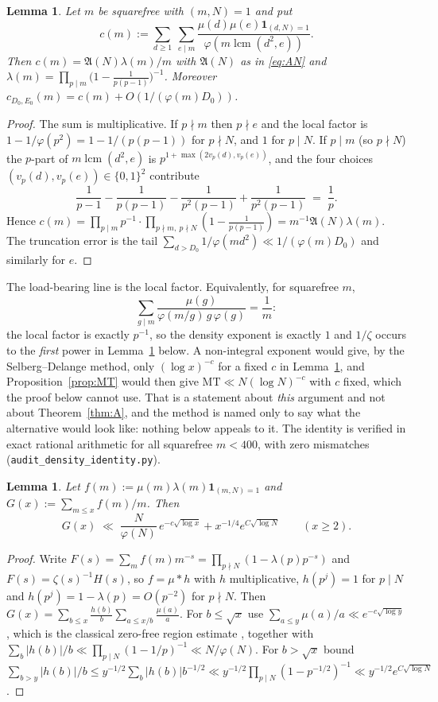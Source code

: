 \documentclass[11pt,a4paper]{article}
\theoremstyle{plain}
\newtheorem{lemma}[theorem]{Lemma}
\theoremstyle{definition}
\theoremstyle{remark}
\newcommand{\AAA}{\mathfrak{A}}
\DeclareMathOperator{\lcm}{lcm}
\begin{document}
\begin{lemma}\label{lem:density}
Let $m$ be squarefree with $(m,N)=1$ and put
\[
  c(m):=\sum_{d\ge1}\ \sum_{e\mid m}
     \frac{\mu(d)\mu(e)\mathbf 1_{(d,N)=1}}{\varphi(m\lcm(d^2,e))}.
\]
Then $c(m)=\AAA(N)\lambda(m)/m$ with $\AAA(N)$ as in \eqref{eq:AN} and
$\lambda(m)=\prod_{p\mid m}\bigl(1-\tfrac{1}{p(p-1)}\bigr)^{-1}$.
Moreover $c_{D_0,E_0}(m)=c(m)+O(1/(\varphi(m)D_0))$.
\end{lemma}

\begin{proof}
The sum is multiplicative. If $p\nmid m$ then $p\nmid e$ and the local
factor is $1-1/\varphi(p^2)=1-1/(p(p-1))$ for $p\nmid N$, and $1$ for
$p\mid N$. If $p\mid m$ (so $p\nmid N$) the $p$-part of
$m\lcm(d^2,e)$ is $p^{1+\max(2v_p(d),v_p(e))}$, and the four choices
$(v_p(d),v_p(e))\in\{0,1\}^2$ contribute
\[
  \frac{1}{p-1}-\frac{1}{p(p-1)}-\frac{1}{p^2(p-1)}+\frac{1}{p^2(p-1)}
  \;=\;\frac{1}{p}.
\]
Hence $c(m)=\prod_{p\mid m}p^{-1}\cdot
\prod_{p\nmid m,\ p\nmid N}(1-\tfrac{1}{p(p-1)})
=m^{-1}\AAA(N)\lambda(m)$. The truncation error is the tail
$\sum_{d>D_0}1/\varphi(md^2)\ll1/(\varphi(m)D_0)$ and similarly for
$e$.
\end{proof}

The load-bearing line is the local factor. Equivalently, for squarefree
$m$,
\[
  \sum_{g\mid m}\frac{\mu(g)}{\varphi(m/g)\,g\,\varphi(g)}=\frac1m :
\]
the local factor is exactly $p^{-1}$, so the density exponent is
exactly $1$ and $1/\zeta$ occurs to the \emph{first} power in
Lemma~\ref{lem:mu} below. A non-integral exponent would give, by
the Selberg--Delange method, only $(\log x)^{-c}$ for a fixed $c$ in
Lemma~\ref{lem:mu}, and Proposition~\ref{prop:MT} would then give
$\mathrm{MT}\ll N(\log N)^{-c}$ with $c$ fixed, which the proof below
cannot use. That is a statement about \emph{this} argument and not
about Theorem~\ref{thm:A}, and the method is named only to say what
the alternative would look like: nothing below appeals to it. The
identity is verified in exact rational arithmetic for all squarefree
$m<400$, with zero mismatches
(\texttt{audit\_density\_identity.py}).

\begin{lemma}\label{lem:mu}
Let $f(m):=\mu(m)\lambda(m)\mathbf 1_{(m,N)=1}$ and
$G(x):=\sum_{m\le x}f(m)/m$. Then
\[
  G(x)\;\ll\;\frac{N}{\varphi(N)}\,e^{-c\sqrt{\log x}}
   +x^{-1/4}e^{C\sqrt{\log N}}
   \qquad(x\ge2).
\]
\end{lemma}

\begin{proof}
Write $F(s)=\sum_m f(m)m^{-s}=\prod_{p\nmid N}(1-\lambda(p)p^{-s})$
and $F(s)=\zeta(s)^{-1}H(s)$, so $f=\mu*h$ with $h$ multiplicative,
$h(p^j)=1$ for $p\mid N$ and $h(p^j)=1-\lambda(p)=O(p^{-2})$ for
$p\nmid N$. Then
$G(x)=\sum_{b\le x}\frac{h(b)}{b}\sum_{a\le x/b}\frac{\mu(a)}{a}$. For
$b\le\sqrt x$ use $\sum_{a\le y}\mu(a)/a\ll e^{-c\sqrt{\log y}}$, which
is the classical zero-free region estimate \cite{MoV}, together with
$\sum_b|h(b)|/b\ll\prod_{p\mid N}(1-1/p)^{-1}\ll N/\varphi(N)$. For
$b>\sqrt x$ bound
$\sum_{b>y}|h(b)|/b\le y^{-1/2}\sum_b|h(b)|b^{-1/2}
\ll y^{-1/2}\prod_{p\mid N}(1-p^{-1/2})^{-1}\ll y^{-1/2}e^{C\sqrt{\log N}}$.
\end{proof}
\end{document}
